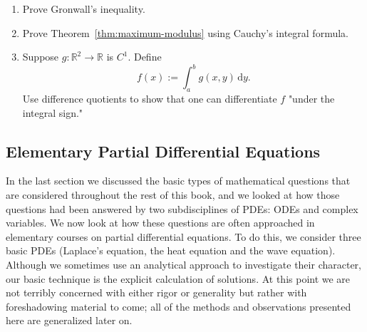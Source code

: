 \begin{enumerate}[label=\thesection.\arabic*.,ref=\thesection.\arabic*,series=book-problems]
\item\label{ex:gronwall-proof} Prove Gronwall's inequality.

\item\label{ex:maximum-modulus-from-cauchy} Prove Theorem~\ref{thm:maximum-modulus} using Cauchy's integral formula.

\item\label{ex:differentiation-under-integral} Suppose $g:\mathbb{R}^2\to\mathbb{R}$ is $C^1$. Define
\[
f(x):=\int_a^bg(x,y)\,\mathrm{d}y.
\]
Use difference quotients to show that one can differentiate $f$ "under the integral sign."

\end{enumerate}

\subsection{Elementary Partial Differential Equations}\label{sec:elementary-pdes}

In the last section we discussed the basic types of mathematical questions that are considered throughout the rest of this book, and we looked at how those questions had been answered by two subdisciplines of PDEs: ODEs and complex variables. We now look at how these questions are often approached in elementary courses on partial differential equations. To do this, we consider three basic PDEs (Laplace's equation, the heat equation and the wave equation). Although we sometimes use an analytical approach to investigate their character, our basic technique is the explicit calculation of solutions. At this point we are not terribly concerned with either rigor or generality but rather with foreshadowing material to come; all of the methods and observations presented here are generalized later on.
